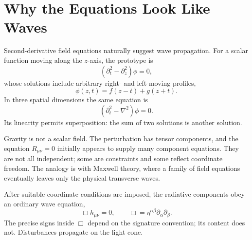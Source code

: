 \begin{classroomqa}
\end{classroomqa}

\section{Why the Equations Look Like Waves}

Second-derivative field equations naturally suggest wave propagation. For a
scalar function moving along the \(z\)-axis, the prototype is
\begin{equation}
 \left(\partial_t^2-\partial_z^2\right)\phi=0,
\end{equation}
whose solutions include arbitrary right- and left-moving profiles,
\begin{equation}
 \phi(z,t)=f(z-t)+g(z+t).
\end{equation}
In three spatial dimensions the same equation is
\begin{equation}
 \left(\partial_t^2-\nabla^2\right)\phi=0.
\end{equation}
Its linearity permits superposition: the sum of two solutions is another
solution.

Gravity is not a scalar field. The perturbation has tensor components, and
the equation \(R_{\mu\nu}=0\) initially appears to supply many component
equations. They are not all independent; some are constraints and some
reflect coordinate freedom. The analogy is with Maxwell theory, where a
family of field equations eventually leaves only the physical transverse
waves.

After suitable coordinate conditions are imposed, the radiative components
obey an ordinary wave equation,
\begin{equation}
 \Box h_{\mu\nu}=0,
 \qquad
 \Box=\eta^{\alpha\beta}\partial_\alpha\partial_\beta.
 \label{eq:linear-wave}
\end{equation}
The precise signs inside \(\Box\) depend on the signature convention; its
content does not. Disturbances propagate on the light cone.

